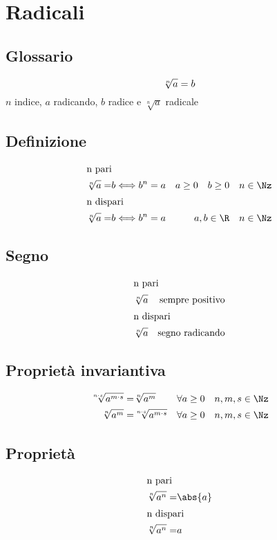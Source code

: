 \chapter{Radicali}
\section{Glossario}
\begin{equation*}
\sqrt[n]{a}=b\\
\end{equation*}
$n$ indice, $a$ radicando, $b$ radice e $\sqrt[n]{a}$ radicale
\section{Definizione}
\begin{align*}
\intertext{n pari}
\sqrt[n]{a}=&b\Longleftrightarrow b^n=a&a\geq0\quad b\geq0\quad n\in\Nz\\
\intertext{n dispari}
\sqrt[n]{a}=&b\Longleftrightarrow b^n=a&a,b\in\R\quad n\in\Nz
\end{align*}
\section{Segno}
\begin{align*}
\intertext{n pari}
\sqrt[n]{a}&&\text{sempre positivo}\\
\intertext{n dispari}
\sqrt[n]{a}&&\text{segno radicando}
\end{align*}
\section{Proprietà invariantiva}
\begin{align*}
\sqrt[n\cdot s]{a^{m\cdot s}}=&\sqrt[n]{a^m}&\forall a\geq 0\quad n,m,s\in\Nz\\
\sqrt[n]{a^m}=&\sqrt[n\cdot s]{a^{m\cdot s}}&\forall a\geq 0\quad n,m,s\in\Nz
\end{align*}
\section{Proprietà}
\begin{align*}
\intertext{n pari}
\sqrt[n]{a^n}=&\abs{a}\\
\intertext{n dispari}
\sqrt[n]{a^n}=&a
\end{align*}
